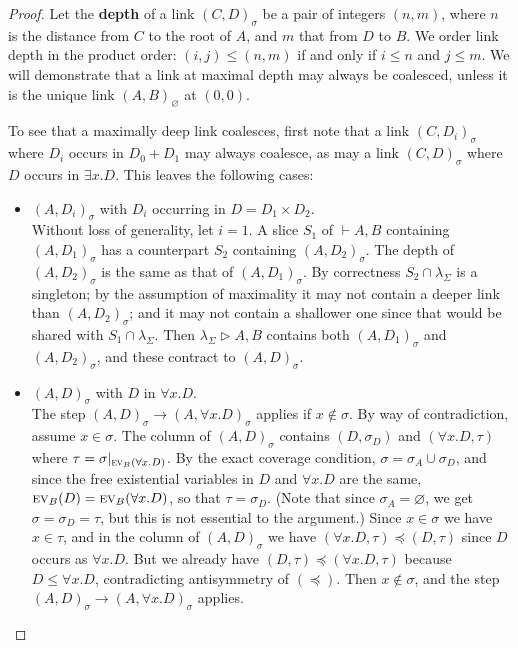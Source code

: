 \documentclass[a4paper,UKenglish]{lipics-v2019}
\newcommand\defn[1]{\textbf{#1}}
\newcommand\ex[2][{}]{\textsc{ev}_{#1}(#2)}
\newcommand\+{+}
\renewcommand\*{\times}
\newcommand\sub{\leq}
\newcommand\dep{\preccurlyeq}
\newcommand\seq[2]{{\vdash}#1,#2}
\newcommand\net[3]{#1\triangleright #2,#3}
\newcommand\res[1]{|_{#1}}
\newcommand\link[3][\sigma]{(#2,#3)_{#1}}
\newcommand\scoal{\rightarrow} %
\begin{document}
\begin{proof}
Let the \defn{depth} of a link $\link CD$ be a pair of integers $(n,m)$, where $n$ is the distance from $C$ to the root of $A$, and $m$ that from $D$ to $B$. We order link depth in the product order: $(i,j)\leq(n,m)$ if and only if $i\leq n$ and $j\leq m$. We will demonstrate that a link at maximal depth may always be coalesced, unless it is the unique link $\link[\varnothing]AB$ at $(0,0)$. 

To see that a maximally deep link coalesces, first note that a link $\link C{D_i}$ where $D_i$ occurs in $D_0{\+}D_1$ may always coalesce, as may a link $\link CD$ where $D$ occurs in $\exists x.D$. This leaves the following cases:
\begin{itemize}
	\item 
$\link A{D_i}$ with $D_i$ occurring in $D=D_1\*D_2$.
\\ 
Without loss of generality, let $i=1$. A slice $S_1$ of $\seq AB$ containing $\link A{D_1}$ has a counterpart $S_2$ containing $\link A{D_2}$. The depth of $\link A{D_2}$ is the same as that of $\link A{D_1}$. By correctness $S_2\cap \lambda_\Sigma$ is a singleton; by the assumption of maximality it may not contain a deeper link than $\link A{D_2}$; and it may not contain a shallower one since that would be shared with $S_1\cap\lambda_\Sigma$. Then $\net{\lambda_\Sigma}AB$ contains both $\link A{D_1}$ and $\link A{D_2}$, and these contract to $\link AD$.
	
	\item 
$\link AD$ with $D$ in $\forall x.D$. 
\\
The step $\link AD\scoal\link A{\forall x.D}$ applies if $x\notin\sigma$. By way of contradiction, assume $x\in\sigma$. The column of $\link AD$ contains $(D,\sigma_D)$ and $(\forall x.D,\tau)$ where $\tau=\sigma\res{\ex[B]{\forall x.D}}$. By the exact coverage condition, $\sigma=\sigma_A\cup\sigma_D$, and since the free existential variables in $D$ and $\forall x.D$ are the same, $\ex[B]D=\ex[B]{\forall x.D}$, so that $\tau=\sigma_D$. (Note that since $\sigma_A=\varnothing$, we get $\sigma=\sigma_D=\tau$, but this is not essential to the argument.) Since $x\in\sigma$ we have $x\in\tau$, and in the column of $\link AD$ we have $(\forall x.D,\tau)\dep(D,\tau)$ since $D$ occurs as $\forall x.D$. But we already have $(D,\tau)\dep(\forall x.D,\tau)$ because $D\sub\forall x.D$, contradicting antisymmetry of $(\dep)$. Then $x\notin\sigma$, and the step $\link AD\scoal\link A{\forall x.D}$ applies.


\end{itemize}
\end{proof}
\end{document}
